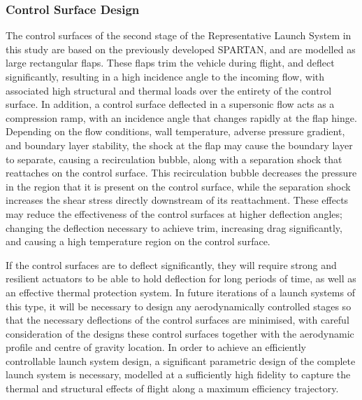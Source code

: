 \subsubsection{Control Surface Design} %
The control surfaces of the second stage of the Representative Launch System in this study are based on the previously developed SPARTAN\cite{Preller2017b}, and are modelled as large rectangular flaps. These flaps trim the vehicle during flight, and deflect significantly, resulting in a high incidence angle to the incoming flow, with associated high structural and thermal loads over the entirety of the control surface.
In addition, a control surface deflected in a supersonic flow acts as a compression ramp, with an incidence angle that changes rapidly at the flap hinge. Depending on the flow conditions, wall temperature, adverse pressure gradient, and boundary layer stability, the shock at the flap may cause the boundary layer to separate, causing a recirculation bubble, along with a separation shock that reattaches on the control surface\cite{Marini2001}. This recirculation bubble decreases the pressure in the region that it is present on the control surface, while the separation shock increases the shear stress directly downstream of its reattachment\cite{Marini2001}. These effects may reduce the effectiveness of the control surfaces at higher deflection angles; changing the deflection necessary to achieve trim, increasing drag significantly, and causing a high temperature region on the control surface. 

 If the control surfaces are to deflect significantly, they will require strong and resilient actuators to be able to hold deflection for long periods of time, as well as an effective thermal protection system. 
In future iterations of a launch systems of this type, it will be necessary to design any aerodynamically controlled stages so that the necessary deflections of the control surfaces are minimised, with careful consideration of the designs these control surfaces together with the aerodynamic profile and centre of gravity location. In order to achieve an efficiently controllable launch system design, a significant parametric design of the complete launch system is necessary, modelled at a sufficiently high fidelity to capture the thermal and structural effects of flight along a maximum efficiency trajectory. 


